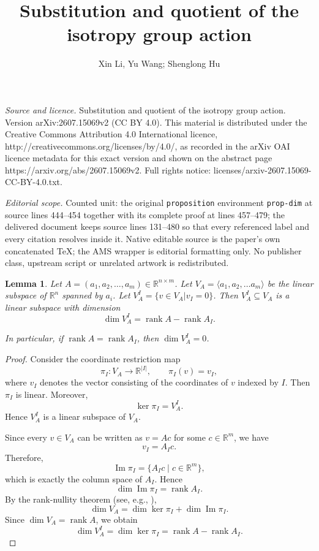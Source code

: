 \documentclass[10pt,a4paper]{amsart}
\newtheorem{lemma}[theorem]{Lemma}
\numberwithin{equation}{section}
\begin{document}
\title[Substitution and quotient of the isotropy group action]{Substitution and quotient of the isotropy group action}
\author{Xin Li, Yu Wang; Shenglong Hu}
\date{}
\maketitle
\noindent\emph{Source and licence.} Substitution and quotient of the isotropy group action. Version arXiv:2607.15069v2 (CC BY 4.0). This material is distributed under the Creative Commons Attribution 4.0 International licence, http://creativecommons.org/licenses/by/4.0/, as recorded in the arXiv OAI licence metadata for this exact version and shown on the abstract page https://arxiv.org/abs/2607.15069v2. Full rights notice: licenses/arxiv-2607.15069-CC-BY-4.0.txt.\par\smallskip
\noindent\textit{Editorial scope.} Counted unit: the original \texttt{proposition} environment \texttt{prop-dim} at source lines 444--454 together with its complete proof at lines 457--479; the delivered document keeps source lines 131--480 so that every referenced label and every citation resolves inside it. Native editable source is the paper's own concatenated TeX; the AMS wrapper is editorial formatting only. No publisher class, upstream script or unrelated artwork is redistributed.
\begin{lemma}\label{lem-rankaai}
Let $A=(a_1,a_2,\ldots,a_m)\in \mathbb{R}^{n\times m}$. Let $V_A=\langle a_1,a_2,\ldots a_m \rangle$ be the linear subspace of $\mathbb{R}^{n}$ spanned by $a_i$. Let $V_A^I=\{v\in V_A| v_I=0 \}$.
Then $V_A^I \subseteq V_A$ is a linear subspace with dimension
$$\dim V_A^I=\operatorname{rank}A-\operatorname{rank}A_I.$$

In particular, if $\operatorname{rank}A=\operatorname{rank}A_I$, then $\dim V_A^I=0$.
\end{lemma}

\begin{proof}
Consider the coordinate restriction map
$$\pi_I:V_A\longrightarrow \mathbb{R}^{|I|},\qquad \pi_I(v)=v_I,$$
where $v_I$ denotes the vector consisting of the coordinates of $v$
indexed by $I$. Then $\pi_I$ is linear. Moreover,
$$\ker \pi_I=V_A^I.$$
Hence $V_A^I$ is a linear subspace of $V_A$.

Since every $v\in V_A$ can be written as $v=A c$
for some $c\in\mathbb{R}^m$, we have
$$v_I=A_I c.$$
Therefore,
$$\operatorname{Im}\pi_I=\{A_I c \mid c\in\mathbb{R}^m\},$$
which is exactly the column space of $A_I$. Hence
$$\dim \operatorname{Im}\pi_I=\operatorname{rank} A_I.$$
By the rank-nullity theorem (see, e.g., \cite[Thm 4.1.6]{artin11}),
$$\dim V_A=\dim \ker\pi_I+\dim\operatorname{Im}\pi_I.$$
Since $\dim V_A=\operatorname{rank} A$, we obtain
$$\dim V_A^I=\dim\ker\pi_I=\operatorname{rank} A-\operatorname{rank} A_I.$$
\end{proof}
\end{document}
